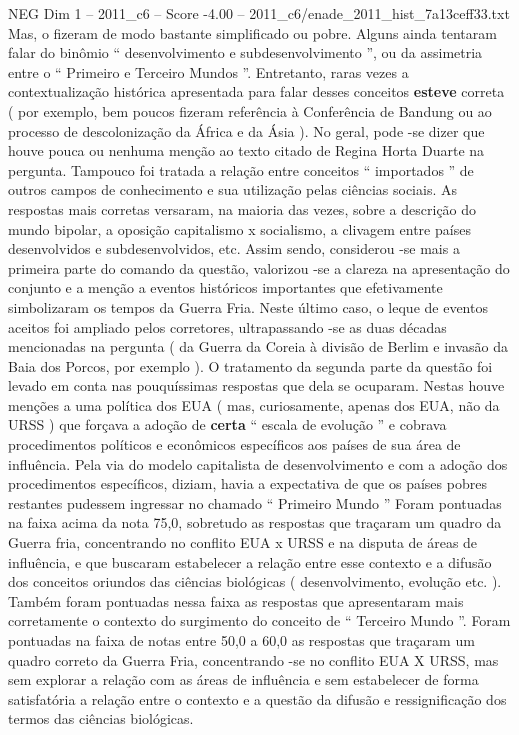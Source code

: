 \begin{textsample}{NEG Dim 1 – 2011\_c6 – Score -4.00 – 2011\_c6/enade\_2011\_hist\_7a13ceff33.txt}
Mas, o fizeram de modo bastante simplificado ou pobre.
Alguns ainda tentaram falar do binômio “ desenvolvimento e subdesenvolvimento ”, ou da assimetria entre o “ Primeiro e Terceiro Mundos ”.
Entretanto, raras vezes a contextualização histórica apresentada para falar desses conceitos \textbf{esteve} correta ( por exemplo, bem poucos fizeram referência à Conferência de Bandung ou ao processo de descolonização da África e da Ásia ).
No geral, pode -se dizer que houve pouca ou nenhuma menção ao texto citado de Regina Horta Duarte na pergunta.
Tampouco foi tratada a relação entre conceitos “ importados ” de outros campos de conhecimento e sua utilização pelas ciências sociais.
As respostas mais corretas versaram, na maioria das vezes, sobre a descrição do mundo bipolar, a oposição capitalismo x socialismo, a clivagem entre países desenvolvidos e subdesenvolvidos, etc.
Assim sendo, considerou -se mais a primeira parte do comando da questão, valorizou -se a clareza na apresentação do conjunto e a menção a eventos históricos importantes que efetivamente simbolizaram os tempos da Guerra Fria.
Neste último caso, o leque de eventos aceitos foi ampliado pelos corretores, ultrapassando -se as duas décadas mencionadas na pergunta ( da Guerra da Coreia à divisão de Berlim e invasão da Baia dos Porcos, por exemplo ).
O tratamento da segunda parte da questão foi levado em conta nas pouquíssimas respostas que dela se ocuparam.
Nestas houve menções a uma política dos EUA ( mas, curiosamente, apenas dos EUA, não da URSS ) que forçava a adoção de \textbf{certa} “ escala de evolução ” e cobrava procedimentos políticos e econômicos específicos aos países de sua área de influência.
Pela via do modelo capitalista de desenvolvimento e com a adoção dos procedimentos específicos, diziam, havia a expectativa de que os países pobres restantes pudessem ingressar no chamado “ Primeiro Mundo ” Foram pontuadas na faixa acima da nota 75,0, sobretudo as respostas que traçaram um quadro da Guerra fria, concentrando no conflito EUA x URSS e na disputa de áreas de influência, e que buscaram estabelecer a relação entre esse contexto e a difusão dos conceitos oriundos das ciências biológicas ( desenvolvimento, evolução etc. ).
Também foram pontuadas nessa faixa as respostas que apresentaram mais corretamente o contexto do surgimento do conceito de “ Terceiro Mundo ”.
Foram pontuadas na faixa de notas entre 50,0 a 60,0 as respostas que traçaram um quadro correto da Guerra Fria, concentrando -se no conflito EUA X URSS, mas sem explorar a relação com as áreas de influência e sem estabelecer de forma satisfatória a relação entre o contexto e a questão da difusão e ressignificação dos termos das ciências biológicas.

\end{textsample}

